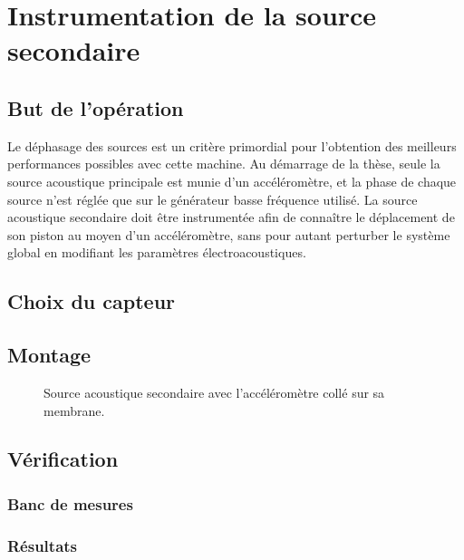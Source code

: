 \chapter{Instrumentation de la source secondaire}\label{chap:InstrumHP}
\section{But de l'opération}
Le déphasage des sources est un critère primordial pour l'obtention des meilleurs performances possibles avec cette machine. Au démarrage de la thèse, seule la source acoustique principale est munie d'un accéléromètre, et la phase de chaque source n'est réglée que sur le générateur basse fréquence utilisé. La source acoustique secondaire doit être instrumentée afin de connaître le déplacement de son piston au moyen d'un accéléromètre, sans pour autant perturber le système global en modifiant les paramètres électroacoustiques.

\section{Choix du capteur}


\section{Montage}
\begin{figure}[!ht]
    \centering
    \caption{Source acoustique secondaire avec l'accéléromètre collé sur sa membrane.}
    \label{fig:HPPeerless_WithAcc}
\end{figure}

\section{Vérification}
\subsection{Banc de mesures}

\subsection{Résultats}